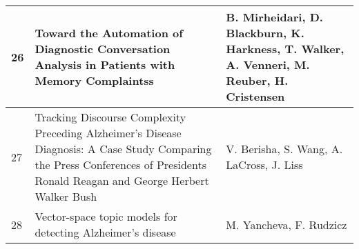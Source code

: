 \documentclass[12pt]{article}
\begin{document}
\begin{longtable}{ p{1cm} | p{6cm} | p{6cm}}
	26 & Toward the Automation of Diagnostic Conversation Analysis in Patients with Memory Complaintss & B. Mirheidari, D. Blackburn, K. Harkness, T. Walker, A. Venneri, M. Reuber, H. Cristensen \\ \hline
	27 & Tracking Discourse Complexity Preceding Alzheimer's Disease Diagnosis: A Case Study Comparing the Press Conferences of Presidents Ronald Reagan and George Herbert Walker Bush & V. Berisha, S. Wang, A. LaCross, J. Liss \\ \hline
	28 & Vector-space topic models for detecting Alzheimer's disease & M. Yancheva, F. Rudzicz \\ \hline
\end{longtable}
\end{document}
